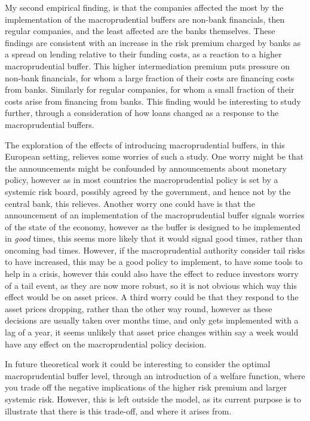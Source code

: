 \documentclass[11pt]{article}
\begin{document}
My second empirical finding, is that the companies affected the most by the implementation of the macroprudential buffers are non-bank financials, then regular companies, and the least affected are the banks themselves. These findings are consistent with an increase in the risk premium charged by banks as a spread on lending relative to their funding costs, as a reaction to a higher macroprudential buffer. This higher intermediation premium puts pressure on non-bank financials, for whom a large fraction of their costs are financing costs from banks. Similarly for regular companies, for whom a small fraction of their costs arise from financing from banks. This finding would be interesting to study further, through a consideration of how loans changed as a response to the macroprudential buffers. 

The exploration of the effects of introducing macroprudential buffers, in this European setting, relieves some worries of such a study. One worry might be that the announcements might be confounded by announcements about monetary policy, however as in most countries the macroprudential policy is set by a systemic risk board, possibly agreed by the government, and hence not by the central bank, this relieves. Another worry one could have is that the announcement of an implementation of the macroprudential buffer signals worries of the state of the economy, however as the buffer is designed to be implemented in \emph{good} times, this seems more likely that it would signal good times, rather than oncoming bad times. However, if the macroprudential authority consider tail risks to have increased, this may be a good policy to implement, to have some tools to help in a crisis, however this could also have the effect to reduce investors worry of a tail event, as they are now more robust, so it is not obvious which way this effect would be on asset prices. A third worry could be that they respond to the asset prices dropping, rather than the other way round, however as these decisions are usually taken over months time, and only gets implemented with a lag of a year, it seems unlikely that asset price changes within say a week would have any effect on the macroprudential policy decision.

In future theoretical work it could be interesting to consider the optimal macroprudential buffer level, through an introduction of a welfare function, where you trade off the negative implications of the higher risk premium and larger systemic risk.  However, this is left outside the model, as its current purpose is to illustrate that there is this trade-off, and where it arises from.
\end{document}

